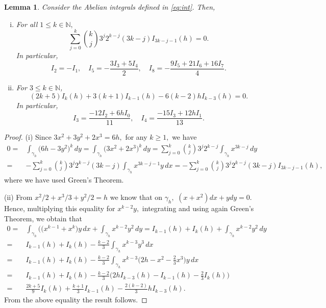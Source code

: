 \documentclass[12pt,a4paper,reqno]{amsart}
\newcommand{\N}{\mathbb{N}}
\newtheorem{lema}[teo]{Lemma}
\begin{document}
\begin{lema}%
Consider the Abelian
integrals defined in \eqref{eq:int}. Then,
\begin{enumerate}[(i)]
\item For all $1\le k\in\N,$
\begin{equation}\label{eqpropquerelacionaIkcomI1}
    \displaystyle\sum_{j=0}^{k} {k\choose j}
         3^j2^{k-j} ( 3k - j) I_{3k- j-1
        }(h)=0.
        \end{equation}
In particular,
\[
I_2=-I_1,\quad  I_5=-\frac{3I_3+5I_4}2,\quad
I_8=-\frac{9I_5+21I_6+16I_7}4.
\]
\item   For $3\leq k\in\N$,
\begin{equation}\label{eq:k}
(2k+5)I_k(h) +3(k+1) I_{k-1}(h) - 6(k-2)hI_{k-3}(h)=0.
\end{equation}
In particular,
\begin{equation}\label{eq:3-4}
I_3=\frac{-12I_2+6hI_0}{11},\quad I_4=\frac{-15I_3+12hI_1}{13}.
\end{equation}
\end{enumerate}

\end{lema}

\begin{proof}  (i)  Since $3x^2+3y^2+2x^3=6h,$ for any $k\ge1,$ we have
\begin{align*}
0=&\int_{\gamma_h} \big(6h-3y^2\big)^k\, dy=\int_{\gamma_h}
\big(3x^2+2x^3\big)^k\, dy= \sum_{j=0}^k {k\choose j} 3^j 2^{k-j}
\int_{\gamma_h}x^{3k-j}\,dy\\=& -\sum_{j=0}^k {k\choose j} 3^j
2^{k-j}(3k-j)\int_{\gamma_h}x^{3k-j-1} y\,dx= -\sum_{j=0}^k
{k\choose j} 3^j 2^{k-j}(3k-j)I_{3k-j-1}(h),
\end{align*}
where we have used Green's Theorem.

            \item[(ii)]  From $x^2/2+x^3/3+y^2/2=h$ we know that on
            $\gamma_h,$ $(x+x^2)dx+ydy=0.$ Hence, multiplying this
            equality for $x^{k-2}y,$  integrating and using again Green's Theorem, we obtain that
            \begin{align*}
0= &\int_{\gamma_h} \Big(\big(x^{k-1}+x^{k}\big)y\,dx+
\int_{\gamma_h} x^{k-2}y^2\,dy= I_{k-1}(h)+I_k(h)+ \int_{\gamma_h}
x^{k-2}y^2\,dy\\=& I_{k-1}(h)+I_k(h)-\frac{k-2}3 \int_{\gamma_h}
x^{k-3}y^3\,dx\\=& I_{k-1}(h)+I_k(h)-\frac{k-2}3 \int_{\gamma_h}
x^{k-3}\Big(2h-x^2-\frac23x^3 \Big)y\,dx\\=&
I_{k-1}(h)+I_k(h)-\frac{k-2}3\Big(2hI_{k-3}(h)-I_{k-1}(h)-\frac23I_k(h)
\Big)\\=&\frac{2k+5}9I_k(h)+\frac{k+1}3I_{k-1}(h)-\frac{2(k-2)}3 h
I_{k-3}(h).
\end{align*}
From the above equality the result follows.



\end{proof}
\end{document}
